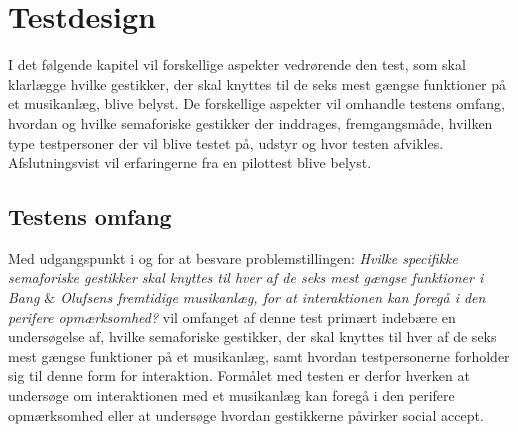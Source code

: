 \chapter{Testdesign}
\label{TestdesignValgAfGestikker}
%
I det følgende kapitel vil forskellige aspekter vedrørende den test, som skal klarlægge hvilke gestikker, der skal knyttes til de seks mest gængse funktioner på et musikanlæg, blive belyst. De forskellige aspekter vil omhandle testens omfang, hvordan og hvilke semaforiske gestikker der inddrages, fremgangsmåde, hvilken type testpersoner der vil blive testet på, udstyr og hvor testen afvikles. Afslutningsvist vil erfaringerne fra en pilottest blive belyst.   
%

\section{Testens omfang}
\label{TestensOmfangValgAfGestikker}
%
Med udgangspunkt i og for at besvare problemstillingen: \textit{Hvilke specifikke semaforiske gestikker skal knyttes til hver af de seks mest gængse funktioner i Bang $\&$ Olufsens fremtidige musikanlæg, for at interaktionen kan foregå i den perifere opmærksomhed?} vil omfanget af denne test primært indebære en undersøgelse af, hvilke semaforiske gestikker, der skal knyttes til hver af de seks mest gængse funktioner på et musikanlæg, samt hvordan testpersonerne forholder sig til denne form for interaktion. Formålet med testen er derfor hverken at undersøge om interaktionen med et musikanlæg kan foregå i den perifere opmærksomhed eller at undersøge hvordan gestikkerne påvirker social accept. 


